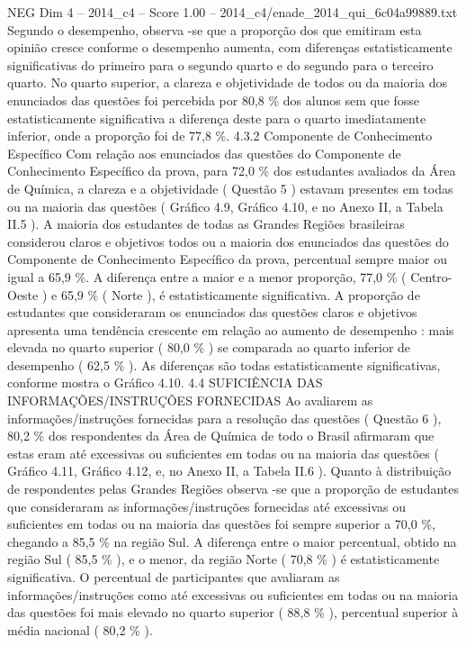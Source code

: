 \begin{textsample}{NEG Dim 4 – 2014\_c4 – Score 1.00 – 2014\_c4/enade\_2014\_qui\_6c04a99889.txt}
Segundo o desempenho, observa -se que a proporção dos que emitiram esta opinião cresce conforme o desempenho aumenta, com diferenças estatisticamente significativas do primeiro para o segundo quarto e do segundo para o terceiro quarto.
No quarto superior, a clareza e objetividade de todos ou da maioria dos enunciados das questões foi percebida por 80,8 \% dos alunos sem que fosse estatisticamente significativa a diferença deste para o quarto imediatamente inferior, onde a proporção foi de 77,8 \%. 4.3.2 Componente de Conhecimento Específico Com relação aos enunciados das questões do Componente de Conhecimento Específico da prova, para 72,0 \% dos estudantes avaliados da Área de Química, a clareza e a objetividade ( Questão 5 ) estavam presentes em todas ou na maioria das questões ( Gráfico 4.9, Gráfico 4.10, e no Anexo II, a Tabela II.5 ).
A maioria dos estudantes de todas as Grandes Regiões brasileiras considerou claros e objetivos todos ou a maioria dos enunciados das questões do Componente de Conhecimento Específico da prova, percentual sempre maior ou igual a 65,9 \%.
A diferença entre a maior e a menor proporção, 77,0 \% ( Centro-Oeste ) e 65,9 \% ( Norte ), é estatisticamente significativa.
A proporção de estudantes que consideraram os enunciados das questões claros e objetivos apresenta uma tendência crescente em relação ao aumento de desempenho : mais elevada no quarto superior ( 80,0 \% ) se comparada ao quarto inferior de desempenho ( 62,5 \% ).
As diferenças são todas estatisticamente significativas, conforme mostra o Gráfico 4.10. 4.4 SUFICIÊNCIA DAS INFORMAÇÕES/INSTRUÇÕES FORNECIDAS Ao avaliarem as informações/instruções fornecidas para a resolução das questões ( Questão 6 ), 80,2 \% dos respondentes da Área de Química de todo o Brasil afirmaram que estas eram até excessivas ou suficientes em todas ou na maioria das questões ( Gráfico 4.11, Gráfico 4.12, e, no Anexo II, a Tabela II.6 ).
Quanto à distribuição de respondentes pelas Grandes Regiões observa -se que a proporção de estudantes que consideraram as informações/instruções fornecidas até excessivas ou suficientes em todas ou na maioria das questões foi sempre superior a 70,0 \%, chegando a 85,5 \% na região Sul.
A diferença entre o maior percentual, obtido na região Sul ( 85,5 \% ), e o menor, da região Norte ( 70,8 \% ) é estatisticamente significativa.
O percentual de participantes que avaliaram as informações/instruções como até excessivas ou suficientes em todas ou na maioria das questões foi mais elevado no quarto superior ( 88,8 \% ), percentual superior à média nacional ( 80,2 \% ).

\end{textsample}
